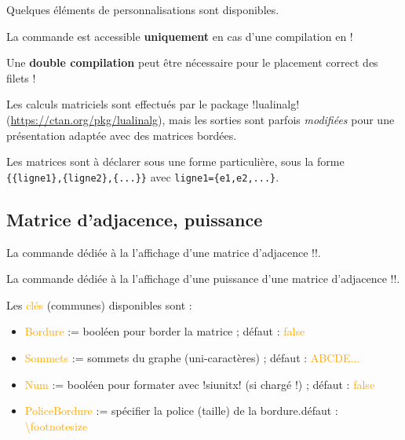 \documentclass[french,a4paper,11pt]{article}
\newcommand\Cle[1]{{\small\sffamily\textlangle \textcolor{orange}{#1}\textrangle}}
\begin{document}
{{\begin{tipblock}
Quelques éléments de personnalisations sont disponibles.
\end{tipblock}

\begin{warningblock}
La commande est accessible \textbf{uniquement} en cas d'une compilation en  !

\smallskip

Une \textbf{double compilation} peut être nécessaire pour le placement correct des filets !

\smallskip

Les calculs matriciels sont effectués par le package \packagetex!lualinalg! (\url{https://ctan.org/pkg/lualinalg}), mais les sorties sont parfois \textit{modifiées} pour une présentation adaptée avec des matrices bordées.

\smallskip

Les matrices sont à déclarer sous une forme particulière, sous la forme \verb|{{ligne1},{ligne2},{...}}| avec \verb|ligne1={e1,e2,...}|.
\end{warningblock}

\subsection{Matrice d'adjacence, puissance}

\begin{cautionblock}
La commande dédiée à la l'affichage d'une matrice d'adjacence \motcletex!\MatriceAdjacence!.

\smallskip

La commande dédiée à la l'affichage d'une puissance d'une matrice d'adjacence \motcletex!\PuissanceMatrice!.
\end{cautionblock}

\begin{DemoCode}

\end{DemoCode}

\begin{tipblock}
Les \Cle{clés} (communes) disponibles sont :

\begin{itemize}
	\item \Cle{Bordure} := booléen pour border la matrice ; \hfill{}défaut : \Cle{false}
	\item \Cle{Sommets} := sommets du graphe (uni-caractères) ; \hfill{}défaut : \Cle{ABCDE...}
	\item \Cle{Num} := booléen pour formater avec \packagetex!siunitx! (si chargé !) ; \hfill{}défaut : \Cle{false}
	\item \Cle{PoliceBordure} := spécifier la police (taille) de la bordure.\hfill{}défaut : \Cle{\textbackslash footnotesize}
\end{itemize}


\end{tipblock}}}
\end{document}
